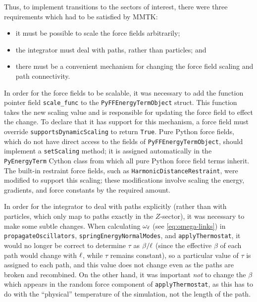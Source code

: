 Thus, to implement transitions to the sectors of interest, there were three requirements which had to be satisfied by MMTK:
\begin{itemize}
	\item it must be possible to scale the force fields arbitrarily;
	\item the integrator must deal with paths, rather than particles; and
	\item there must be a convenient mechanism for changing the force field scaling and path connectivity.
\end{itemize}

In order for the force fields to be scalable, it was necessary to add the function pointer field \texttt{scale\_func} to the \texttt{PyFFEnergyTermObject} struct.
This function takes the new scaling value and is responsible for updating the force field to effect the change.
To declare that it has support for this mechanism, a force field must override \texttt{supportsDynamicScaling} to return \texttt{True}.
Pure Python force fields, which do not have direct access to the fields of \texttt{PyFFEnergyTermObject}, should implement a \texttt{setScaling} method; it is assigned automatically in the \texttt{PyEnergyTerm} Cython class from which all pure Python force field terms inherit.
The built-in restraint force fields, such as \texttt{HarmonicDistanceRestraint}, were modified to support this scaling; these modifications involve scaling the energy, gradients, and force constants by the required amount.

In order for the integrator to deal with paths explicitly (rather than with particles, which only map to paths exactly in the $Z$-sector), it was necessary to make some subtle changes.
When calculating $\omega_\ell$ (see \vref{eq:omega-links}) in \texttt{propagateOscillators}, \texttt{springEnergyNormalModes}, and \texttt{applyThermostat}, it would no longer be correct to determine $\tau$ as $\beta / \ell$ (since the effective $\beta$ of each path would change with $\ell$, while $\tau$ remains constant), so a particular value of $\tau$ is assigned to each path, and this value does not change even as the paths are broken and recombined.
On the other hand, it was important \emph{not} to change the $\beta$ which appears in the random force component of \texttt{applyThermostat}, as this has to do with the ``physical'' temperature of the simulation, not the length of the path.

